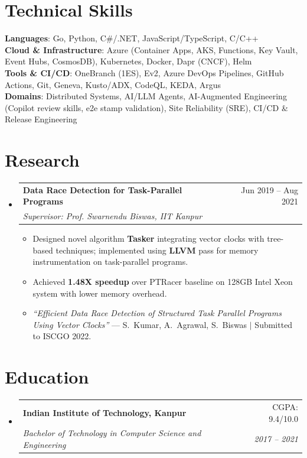 \documentclass[a4paper,9pt]{extarticle}
\makeatletter
\newcommand{\resumeSubheading}[4]{
  \vspace{-2pt}\item
    \begin{tabular*}{0.97\textwidth}[t]{l@{\extracolsep{\fill}}r}
      \textbf{#1} & #2 \\
      \textit{\small #3} & \textit{\small #4} \\
    \end{tabular*}\vspace{-6pt}
}
\newcommand{\resumeItemPlain}[1]{
  \item\small{#1 \vspace{-3pt}}
}
\newcommand{\resumeSubHeadingListStart}{\begin{itemize}[leftmargin=0.15in, label={}]}
\newcommand{\resumeSubHeadingListEnd}{\end{itemize}}
\newcommand{\resumeItemListStart}{\begin{itemize}}
\newcommand{\resumeItemListEnd}{\end{itemize}\vspace{-6pt}}
\makeatother
\begin{document}
\section{Technical Skills}
 \begin{itemize}[leftmargin=0.15in, label={}]
    \small{\item{
     \textbf{Languages}{: Go, Python, C\#/.NET, JavaScript/TypeScript, C/C++} \\
     \textbf{Cloud \& Infrastructure}{: Azure (Container Apps, AKS, Functions, Key Vault, Event Hubs, CosmosDB), Kubernetes, Docker, Dapr (CNCF), Helm} \\
     \textbf{Tools \& CI/CD}{: OneBranch (1ES), Ev2, Azure DevOps Pipelines, GitHub Actions, Git, Geneva, Kusto/ADX, CodeQL, KEDA, Argus} \\
     \textbf{Domains}{: Distributed Systems, AI/LLM Agents, AI-Augmented Engineering (Copilot review skills, e2e stamp validation), Site Reliability (SRE), CI/CD \& Release Engineering}
    }}
 \end{itemize}

\section{Research}
  \resumeSubHeadingListStart
    \resumeSubheading
      {Data Race Detection for Task-Parallel Programs}{Jun 2019 -- Aug 2021}
      {Supervisor: Prof. Swarnendu Biswas, IIT Kanpur}{}
      \resumeItemListStart
        \resumeItemPlain{Designed novel algorithm \textbf{Tasker} integrating vector clocks with tree-based techniques; implemented using \textbf{LLVM} pass for memory instrumentation on task-parallel programs.}
        \resumeItemPlain{Achieved \textbf{1.48X speedup} over PTRacer baseline on 128GB Intel Xeon system with lower memory overhead.}
        \resumeItemPlain{\textit{``Efficient Data Race Detection of Structured Task Parallel Programs Using Vector Clocks''} --- S.~Kumar, A.~Agrawal, S.~Biswas $|$ Submitted to ISCGO 2022.}
      \resumeItemListEnd
  \resumeSubHeadingListEnd

\section{Education}
  \resumeSubHeadingListStart
    \resumeSubheading
      {Indian Institute of Technology, Kanpur}{CGPA: 9.4/10.0}
      {Bachelor of Technology in Computer Science and Engineering}{2017 -- 2021}
  \resumeSubHeadingListEnd
\end{document}
